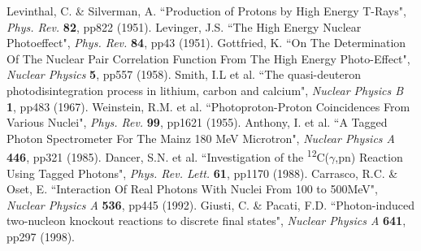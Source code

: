 \documentclass[a4paper,12pt]{article}
\begin{document}
\begin{thebibliography}{99}
 Levinthal, C. \& Silverman, A. ``Production of Protons by High Energy T-Rays", \textit{Phys. Rev.} \textbf{82}, pp822 (1951).
 Levinger, J.S. ``The High Energy Nuclear Photoeffect", \textit{Phys. Rev.} \textbf{84}, pp43 (1951).
 Gottfried, K. ``On The Determination Of The Nuclear Pair Correlation Function From The High Energy Photo-Effect", \textit{Nuclear Physics} \textbf{5}, pp557 (1958).
 Smith, I.L et al. ``The quasi-deuteron photodisintegration process in lithium,
carbon and calcium", \textit{Nuclear Physics B} \textbf{1}, pp483 (1967).
 Weinstein, R.M. et al. ``Photoproton-Proton Coincidences From Various Nuclei", \textit{Phys. Rev.} \textbf{99}, pp1621 (1955).
 Anthony, I. et al. ``A Tagged Photon Spectrometer For The Mainz 180 MeV Microtron", \textit{Nuclear Physics A} \textbf{446}, pp321 (1985).
 Dancer, S.N. et al. ``Investigation of the \textsuperscript{12}C($\gamma$,pn) Reaction Using Tagged Photons", \textit{Phys. Rev. Lett.} \textbf{61}, pp1170 (1988).
 Carrasco, R.C. \& Oset, E. ``Interaction Of Real Photons With Nuclei From 100 to 500MeV", \textit{Nuclear Physics A} \textbf{536}, pp445 (1992).
 Giusti, C. \& Pacati, F.D. ``Photon-induced two-nucleon knockout reactions to discrete final states", \textit{Nuclear Physics A} \textbf{641}, pp297 (1998).

\end{thebibliography}
\end{document}
